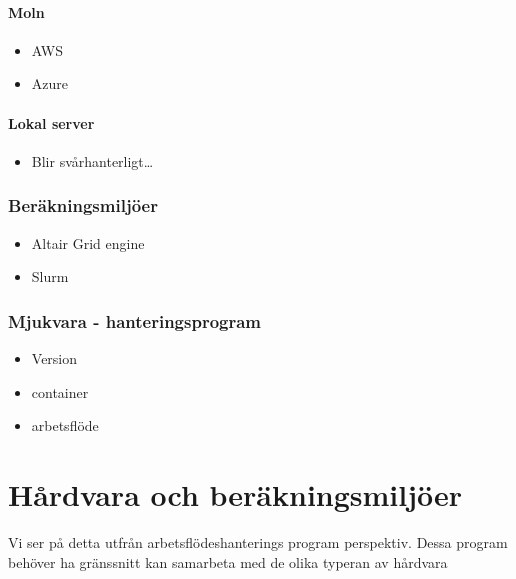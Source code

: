 \documentclass[
  letterpaper,
  DIV=11,
  numbers=noendperiod]{scrreprt}
\providecommand{\tightlist}{%
  \setlength{\itemsep}{0pt}\setlength{\parskip}{0pt}}\usepackage{longtable,booktabs,array}
\begin{document}
\subsubsection{Moln}\label{moln}

\begin{itemize}
\tightlist
\item
  AWS
\item
  Azure
\end{itemize}

\subsubsection{Lokal server}\label{lokal-server}

\begin{itemize}
\tightlist
\item
  Blir svårhanterligt\ldots{}
\end{itemize}

\subsection{Beräkningsmiljöer}\label{beruxe4kningsmiljuxf6er}

\begin{itemize}
\tightlist
\item
  Altair Grid engine
\item
  Slurm
\end{itemize}

\subsection{Mjukvara -
hanteringsprogram}\label{mjukvara---hanteringsprogram}

\begin{itemize}
\item
  Version
\item
  container
\item
  arbetsflöde
\end{itemize}


\chapter{Hårdvara och
beräkningsmiljöer}\label{huxe5rdvara-och-beruxe4kningsmiljuxf6er}

Vi ser på detta utfrån arbetsflödeshanterings program perspektiv. Dessa
program behöver ha gränssnitt kan samarbeta med de olika typeran av
hårdvara
\end{document}

